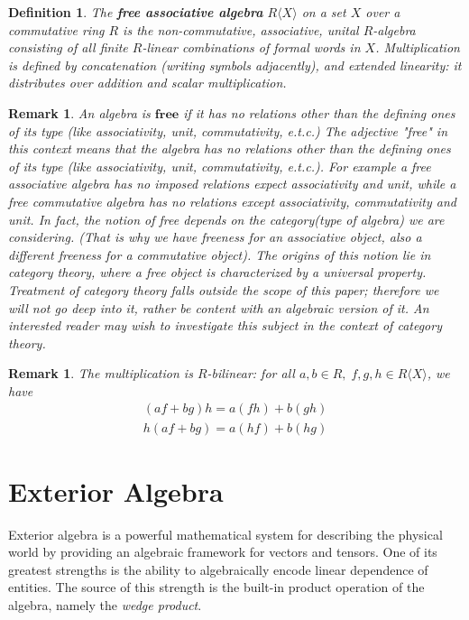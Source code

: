 \documentclass[12pt]{article}
\newtheorem{definition}[theorem]{Definition}
\newtheorem{remark}[theorem]{Remark}
\numberwithin{theorem}{section}
\numberwithin{equation}{theorem}
\begin{document}
\pagebreak
\begin{definition}
    The \textbf{free associative algebra} $R\langle X \rangle$ on a set $X$ over a commutative ring $R$ is the non-commutative, associative, unital $R$-algebra consisting of all finite $R$-linear combinations of formal words in $X$. Multiplication is defined by concatenation (writing symbols adjacently), and extended linearity: it distributes over addition and scalar multiplication.
\end{definition}
\begin{remark}\label{free}
    An algebra is $\textbf{free}$ if it has no relations other than the defining ones of its type (like associativity, unit, commutativity, e.t.c.) 
    The adjective "free" in this context means that the algebra has no relations other than the defining ones of its type (like associativity, unit, commutativity, e.t.c.). For example a \emph{free associative algebra} has no imposed relations expect associativity and unit, while a \emph{free commutative algebra} has no relations except associativity, commutativity and unit. In fact, the notion of \emph{free} depends on the category(type of algebra) we are considering.
    (That is why we have \emph{freeness} for an associative object, also a different \emph{freeness} for a commutative object). The origins of this notion lie in category theory, where a free object is characterized by a universal property. Treatment of category theory falls outside the scope of this paper; therefore we will not go deep into it, rather be content with an algebraic version of it. An interested reader may wish to investigate this subject in the context of category theory.
\end{remark}
\begin{remark}
    The multiplication is $R$-bilinear:
    for all $a, b \in R, \; f, g, h \in R\langle X \rangle$, we have
    \begin{gather*}
        (af + bg)h = a(fh) + b(gh)\\
        h(af + bg) = a(hf) + b(hg)
    \end{gather*}
\end{remark}


\pagebreak

\section{Exterior Algebra}

Exterior algebra is a powerful mathematical system for describing the physical world by providing an algebraic framework for vectors and tensors. One of its greatest strengths is the ability to algebraically encode linear dependence of entities. The source of this strength is the built-in product operation of the algebra, namely the \emph{wedge product}. 
\end{document}

